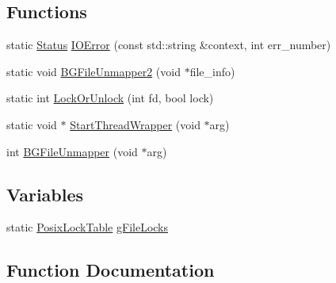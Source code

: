 \subsection*{Functions}
\begin{DoxyCompactItemize}
\item 
static \hyperlink{classleveldb_1_1_status}{Status} \hyperlink{namespaceleveldb_1_1anonymous__namespace_02env__posix_8cc_03_a1292cfc7eb1be31555c6d7124519afa1}{I\+O\+Error} (const std\+::string \&context, int err\+\_\+number)
\item 
static void \hyperlink{namespaceleveldb_1_1anonymous__namespace_02env__posix_8cc_03_a66f25b0d92f8d29676cd1b8e412237ec}{B\+G\+File\+Unmapper2} (void $\ast$file\+\_\+info)
\item 
static int \hyperlink{namespaceleveldb_1_1anonymous__namespace_02env__posix_8cc_03_a956300c4adfcbe5ccbbcef79b0a7d8e5}{Lock\+Or\+Unlock} (int fd, bool lock)
\item 
static void $\ast$ \hyperlink{namespaceleveldb_1_1anonymous__namespace_02env__posix_8cc_03_a65e3f0fe7b0373024902f346f7df1bfe}{Start\+Thread\+Wrapper} (void $\ast$arg)
\item 
int \hyperlink{namespaceleveldb_1_1anonymous__namespace_02env__posix_8cc_03_a0c6f1b7c9116df6aa78205797a8a60ed}{B\+G\+File\+Unmapper} (void $\ast$arg)
\end{DoxyCompactItemize}
\subsection*{Variables}
\begin{DoxyCompactItemize}
\item 
static \hyperlink{classleveldb_1_1anonymous__namespace_02env__posix_8cc_03_1_1_posix_lock_table}{Posix\+Lock\+Table} \hyperlink{namespaceleveldb_1_1anonymous__namespace_02env__posix_8cc_03_ae7dd8d96243a5abc6778648e20d1f729}{g\+File\+Locks}
\end{DoxyCompactItemize}


\subsection{Function Documentation}
\hypertarget{namespaceleveldb_1_1anonymous__namespace_02env__posix_8cc_03_a0c6f1b7c9116df6aa78205797a8a60ed}{}
